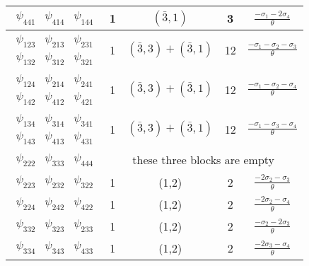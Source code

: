 \documentclass[a4paper,12pt,oneside]{article}
\begin{document}
\begin{table}
\begin{center}
\begin{tabular}{|c|c|c|c|c|}
$\begin{array}{ccc}\psi_{441} & \psi_{414} & 
\psi_{144} \end{array}$ & 1 & $(\bar{3},1)$ &
3 & $\frac{-\sigma_1-2\sigma_4}{\theta}$ \\ \hline
$\begin{array}{ccc}
\psi_{123} & \psi_{213} & \psi_{231} \\
\psi_{132} & \psi_{312} & \psi_{321}
\end{array}$ & 1 & $(\bar{3},3)+(\bar{3},1)$ & 12 & $\frac{-\sigma_1-\sigma_2-\sigma_3}{\theta}$ \\ \hline
$\begin{array}{ccc}
\psi_{124} & \psi_{214} & \psi_{241} \\
\psi_{142} & \psi_{412} & \psi_{421}
\end{array}$ & 1 & $(\bar{3},3)+(\bar{3},1)$ & 12 & $\frac{-\sigma_1-\sigma_2-\sigma_4}{\theta}$ \\ \hline
$\begin{array}{ccc}
\psi_{134} & \psi_{314} & \psi_{341} \\
\psi_{143} & \psi_{413} & \psi_{431}
\end{array}$ & 1 & $(\bar{3},3)+(\bar{3},1)$ & 12 & $\frac{-\sigma_1-\sigma_3-\sigma_4}{\theta}$ \\ \hline
$\begin{array}{ccc}
\psi_{222} & \psi_{333} & \psi_{444}
\end{array}$ &
\multicolumn{4}{|c|}{these three blocks are empty} \\ \hline
$\begin{array}{ccc} \psi_{223} & \psi_{232} & \psi_{322} \end{array}$ & 1 & (1,2) & 2 & $\frac{-2\sigma_2-\sigma_3}{\theta}$ \\ 
$\begin{array}{ccc} \psi_{224} & \psi_{242} & \psi_{422} \end{array}$ & 1 & (1,2) & 2 & $\frac{-2\sigma_2-\sigma_4}{\theta}$ \\ 
$\begin{array}{ccc} \psi_{332} & \psi_{323} & \psi_{233} \end{array}$ & 1 & (1,2) & 2 & $\frac{-\sigma_2-2\sigma_3}{\theta}$ \\ 
$\begin{array}{ccc} \psi_{334} & \psi_{343} & \psi_{433} \end{array}$ & 1 & (1,2) & 2 & $\frac{-2\sigma_3-\sigma_4}{\theta}$ \\ 

\end{tabular}
\end{center}
\end{table}
\end{document}
